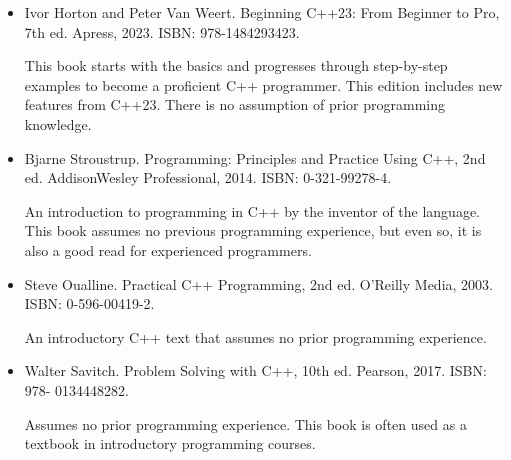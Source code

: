 


\begin{itemize}
\item
Ivor Horton and Peter Van Weert. Beginning C++23: From Beginner to Pro, 7th ed. Apress, 2023. ISBN: 978-1484293423.

This book starts with the basics and progresses through step-by-step examples to become a proficient C++ programmer. This edition includes new features from C++23. There is no assumption of prior programming knowledge.

\item
Bjarne Stroustrup. Programming: Principles and Practice Using C++, 2nd ed. AddisonWesley Professional, 2014. ISBN: 0-321-99278-4.

An introduction to programming in C++ by the inventor of the language. This book assumes no previous programming experience, but even so, it is also a good read for experienced programmers.

\item
Steve Oualline. Practical C++ Programming, 2nd ed. O’Reilly Media, 2003. ISBN: 0-596-00419-2.

An introductory C++ text that assumes no prior programming experience.

\item
Walter Savitch. Problem Solving with C++, 10th ed. Pearson, 2017. ISBN: 978- 0134448282.

Assumes no prior programming experience. This book is often used as a textbook in introductory programming courses.
\end{itemize}


